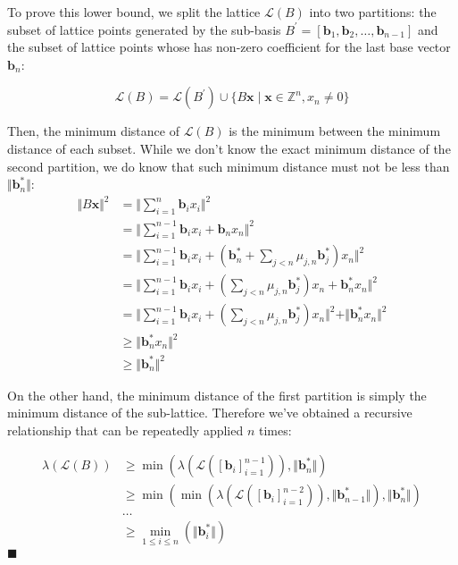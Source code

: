 To prove this lower bound, we split the lattice $\mathcal{L}(B)$ into two partitions: the subset of lattice points generated by the sub-basis $B^\prime = [\mathbf{b}_1, \mathbf{b}_2, \ldots, \mathbf{b}_{n-1}]$ and the subset of lattice points whose has non-zero coefficient for the last base vector $\mathbf{b}_n$:

$$
\mathcal{L}(B) = 
\mathcal{L}(B^\prime) 
\cup \{B\mathbf{x} \mid \mathbf{x} \in \mathbb{Z}^n, x_n \neq 0\}
$$

Then, the minimum distance of $\mathcal{L}(B)$ is the minimum between the minimum distance of each subset. While we don't know the exact minimum distance of the second partition, we do know that such minimum distance must not be less than $\Vert \mathbf{b}_n^\ast \Vert$:
$$
\begin{aligned}
\Vert B\mathbf{x} \Vert^2 &= \Vert \sum_{i=1}^n\mathbf{b}_i x_i \Vert^2 \\
&= \Vert \sum_{i=1}^{n-1}\mathbf{b}_ix_i + \mathbf{b}_nx_n \Vert^2 \\
&= \Vert \sum_{i=1}^{n-1}\mathbf{b}_ix_i + (\mathbf{b}_n^* + \sum_{j<n}\mu_{j, n}\mathbf{b}_j^\ast)x_n \Vert^2 \\
&= \Vert \sum_{i=1}^{n-1}\mathbf{b}_ix_i + (\sum_{j<n}\mu_{j, n}\mathbf{b}_j^\ast) x_n  + \mathbf{b}_n^\ast x_n\Vert^2 \\
&= \Vert \sum_{i=1}^{n-1}\mathbf{b}_ix_i + (\sum_{j<n}\mu_{j, n}\mathbf{b}_j^\ast) x_n \Vert^2 + \Vert \mathbf{b}_n^\ast x_n \Vert^2 \\
&\geq \Vert \mathbf{b}_n^\ast x_n \Vert^2 \\
&\geq \Vert \mathbf{b}_n^\ast \Vert^2
\end{aligned}
$$

On the other hand, the minimum distance of the first partition is simply the minimum distance of the sub-lattice. Therefore we've obtained a recursive relationship that can be repeatedly applied $n$ times:

$$
\begin{aligned}
\lambda(\mathcal{L}(B)) 
&\geq \min(\lambda(\mathcal{L}([\mathbf{b}_i]_{i=1}^{n-1})), \Vert \mathbf{b}_n^\ast \Vert) \\
&\geq \min(
    \min(
        \lambda(\mathcal{L}([\mathbf{b}_i]_{i=1}^{n-2})), 
        \Vert \mathbf{b}_{n-1}^\ast \Vert
    )
    , \Vert \mathbf{b}_n^\ast \Vert
) \\
& \ldots \\
&\geq \min_{1 \leq i \leq n}(\Vert \mathbf{b}_i^\ast\Vert)
\end{aligned}
$$
$\blacksquare$

